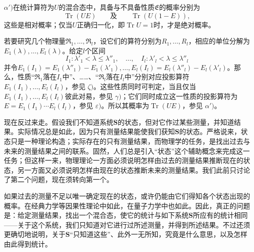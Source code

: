 \documentclass[fontsize=13pt,twoside,openany,headings=normal,parskip=false,bookmarkpackage=false,DIV=calc]{scrbook}
\begin{document}
\noindent{}$\alpha')$\label{prop:IV.3.alphaprime}在统计算符为$U$的混合态中，具备与不具备性质$\mathfrak E$的概率分别为
\[
\operatorname{Tr}(UE)\qquad\text{及}\qquad\operatorname{Tr}(U(1-E)),
\]
这些是相对概率；仅当$U$正确归一化，即$\operatorname{Tr}U=1$时，才是绝对概率。

若要研究几个物理量$\mathfrak R_1,\allowbreak \ldots,\allowbreak \mathfrak R_l$，设它们的算符分别为$R_1,\allowbreak \ldots,\allowbreak R_l$，相应的单位分解为$E_1(\lambda),\allowbreak \ldots,\allowbreak E_l(\lambda)$。给定$l$个区间
\[
I_1:\lambda'_1<\lambda\leq\lambda''_1,\quad\ldots,\quad
I_l:\lambda'_l<\lambda\leq\lambda''_l
\]
并令$E_1(I_1)=E_1(\lambda''_1)-E_1(\lambda'_1),\allowbreak \ldots,\allowbreak E_l(I_l)=E_l(\lambda''_l)-E_l(\lambda'_l)$。那么，性质“$\mathfrak R_1$落在$I_1$中”、……、“$\mathfrak R_l$落在$I_l$中”分别对应投影算符$E_1(I_1),\allowbreak \ldots,\allowbreak E_l(I_l)$，参见 \hyperref[post:III.5.zeta]{$\zeta)$}。这些性质同时可判定，当且仅当$E_1(I_1),\allowbreak \ldots,\allowbreak E_l(I_l)$彼此对易，参见 \hyperref[post:III.5.gamma]{$\gamma)$}；它们同时成立这一性质的投影算符为$E=E_1(I_1)\cdots E_l(I_l)$，参见 \hyperref[post:III.5.epsilon]{$\varepsilon)$}。所以其概率为$\operatorname{Tr}(UE)$，参见 \hyperref[prop:IV.3.alphaprime]{$\alpha')$}。

现在反过来走。假设我们不知道系统$\boldsymbol{S}$的状态，但对它作过某些测量，并知道结果。实际情况总是如此，因为只有测量结果能使我们获知$\boldsymbol{S}$的状态。严格说来，状态只是一种理论构造；实际存在的只有测量结果，而物理学的任务，是找出过去与未来的测量结果之间的联系。固然，人们总是引入“状态”这个辅助概念来完成这一任务；但这样一来，物理理论一方面必须说明怎样由过去的测量结果推断现在的状态，另一方面又必须说明怎样由现在的状态推断未来的测量结果。我们此前只讨论了\hypertarget{origpage-179}{}\label{origpage-179}第二个问题，现在须转向第一个。

如果过去的测量不足以唯一确定现在的状态，或许仍能由它们得知各个状态出现的概率。在经典力学等因果性理论中如此，在量子力学中也如此。因此，真正的问题是：给定测量结果，找出一个混合态，使它的统计与如下系统$\boldsymbol{S}$所应有的统计相同——关于这个系统，我们只知道对它进行过所述测量，并得到所述结果。不过还须更确切地说明，关于$\boldsymbol{S}$“只知道这些”、此外一无所知，究竟是什么意思，以及怎样由此得到统计。
\end{document}
